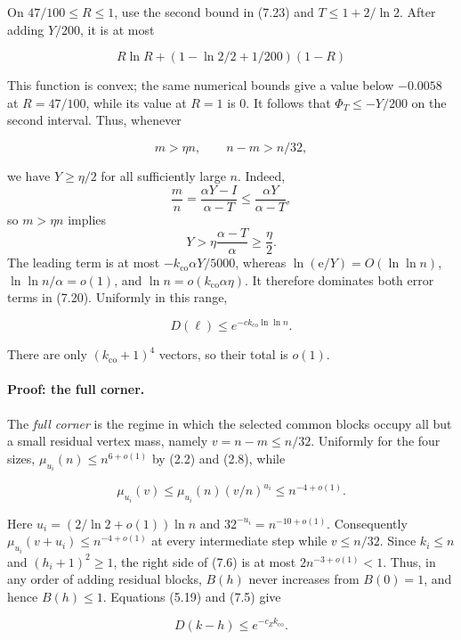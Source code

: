 \documentclass[11pt,reqno]{amsart}
\begin{document}
On \(47/100\le R\le1\), use the second bound in (7.23) and
\(T\le1+2/{\ln 2}\).  After adding \(Y/200\), it is at most

\[
 R\ln R+(1-{\ln 2}/2+1/200)(1-R)
\]

This function is convex; the same numerical bounds give a value below
\(-0.0058\) at \(R=47/100\), while its value at \(R=1\) is \(0\).
It follows that \(\Phi_T\le-Y/200\) on the second interval.
Thus, whenever

\[
 m>\eta n,\qquad n-m>n/32,                               \tag{7.24}
\]

we have \(Y\ge\eta/2\) for all sufficiently large \(n\). Indeed,
\[
 \frac mn=\frac{\alpha Y-I}{\alpha-T}
 \le\frac{\alpha Y}{\alpha-T},
\]
so \(m>\eta n\) implies
\[
 Y>\eta\frac{\alpha-T}{\alpha}\ge\frac{\eta}{2}.
\]
The leading term is at most
\(-k_{\mathrm{co}}\alpha Y/5000\), whereas
\(\ln(\mathrm{e}/Y)=O({\ln\ln n})\), \({\ln\ln n}/\alpha=o(1)\),
and \({\ln n}=o(k_{\mathrm{co}}\alpha\eta)\). It therefore dominates both error terms
in (7.20). Uniformly in this range,

\[
 D(\ell)\le e^{-c k_{\mathrm{co}}{\ln\ln n}}.                              \tag{7.25}
\]

There are only \((k_{\mathrm{co}}+1)^4\) vectors, so their total is
\(o(1)\).

\paragraph{Proof: the full corner.}\label{proof-the-full-corner}

The \emph{full corner} is the regime in which the selected common blocks
occupy all but a small residual vertex mass, namely \(v=n-m\le n/32\).
Uniformly for the
four sizes,
\(\mu_{u_i}(n)\le n^{6+o(1)}\)
by (2.2) and (2.8), while

\[
 \mu_{u_i}(v)\le\mu_{u_i}(n)(v/n)^{u_i}\le n^{-4+o(1)}. \tag{7.26}
\]

Here \(u_i=(2/{\ln 2}+o(1)){\ln n}\) and
\(32^{-u_i}=n^{-10+o(1)}\).
Consequently \(\mu_{u_i}(v+u_i)\le n^{-4+o(1)}\) at every intermediate
step while \(v\le n/32\).  Since \(k_i\le n\) and
\((h_i+1)^2\ge1\), the right side of (7.6) is at most
\(2n^{-3+o(1)}<1\).  Thus, in any order of adding residual blocks,
\(B(h)\) never increases from \(B(0)=1\), and hence \(B(h)\le1\).
Equations (5.19) and (7.5) give

\[
 D(k-h)\le e^{-c_Zk_{\mathrm{co}}}.                               \tag{7.27}
\]
\end{document}
